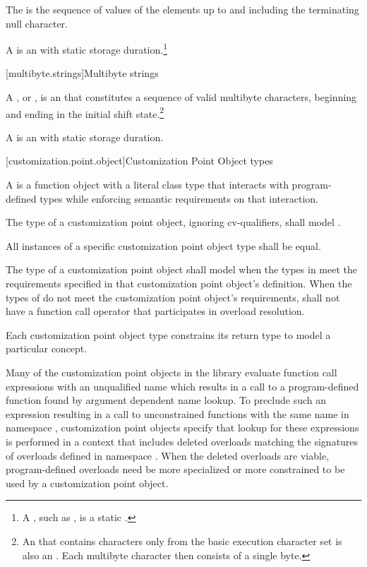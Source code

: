\pnum
The 
is the sequence of values of the
elements up to and including the terminating null character.

\pnum
A 
is an \ntbs{} with
static storage duration.\footnote{A , such as
,
is a static \ntbs{}.}

[multibyte.strings]{Multibyte strings}

%
\pnum
A ,
or \ntmbs{},
is an \ntbs{} that constitutes a
sequence of valid multibyte characters, beginning and ending in the initial
shift state.\footnote{An \ntbs{} that contains characters only from the
basic execution character set is also an \ntmbs{}.
Each multibyte character then
consists of a single byte.}

\pnum
A 
is an \ntmbs{} with static storage duration.

[customization.point.object]{Customization Point Object types}

\pnum
A  is a function object
with a literal class type that interacts with program-defined types while
enforcing semantic requirements on that interaction.

\pnum
The type of a customization point object, ignoring cv-qualifiers, shall model
.

\pnum
All instances of a specific customization point object type shall
be equal.

\pnum
The type  of a customization point object shall model
when the types in  meet the requirements specified in that
customization point object's definition. When the types of  do
not meet the customization point object's requirements,  shall not have
a function call operator that participates in overload resolution.

\pnum
Each customization point object type constrains its return type to model a
particular concept.

\pnum
\begin{note}
Many of the customization point objects in the library evaluate function call
expressions with an unqualified name which results in a call to a
program-defined function found by argument dependent name
lookup. To preclude such an expression resulting in a
call to unconstrained functions with the same name in namespace ,
customization point objects specify that lookup for these expressions is
performed in a context that includes deleted overloads matching the signatures
of overloads defined in namespace . When the deleted overloads are
viable, program-defined overloads need be more specialized
or more constrained to be used by a customization point
object.
\end{note}

